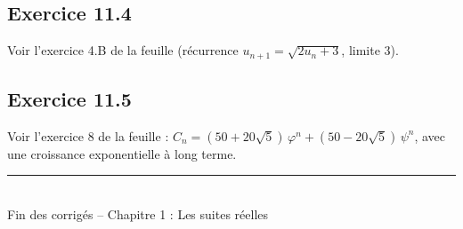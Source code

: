 \documentclass[11pt,a4paper]{article}
\begin{document}
\subsection{Exercice 11.4}

Voir l'exercice 4.B de la feuille (récurrence $u_{n+1}=\sqrt{2u_n+3}$, limite $3$).

\subsection{Exercice 11.5}

Voir l'exercice 8 de la feuille : $C_n=(50+20\sqrt{5})\,\varphi^n+(50-20\sqrt{5})\,\psi^n$, avec une croissance exponentielle à long terme.

\vspace{0.8cm}
\begin{center}
{\color{mundigray}\rule{0.4\textwidth}{0.4pt}}\\[0.3cm]
{\small\color{mundigray} Fin des corrigés -- Chapitre 1 : Les suites réelles}
\end{center}
\end{document}
